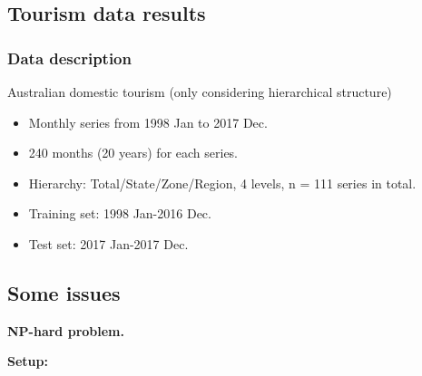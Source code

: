 \documentclass[
  letterpaper,
  DIV=11,
  numbers=noendperiod]{scrartcl}
\providecommand{\tightlist}{%
  \setlength{\itemsep}{0pt}\setlength{\parskip}{0pt}}\usepackage{longtable,booktabs,array}
\begin{document}
\hypertarget{tourism-data-results}{%
\subsection{Tourism data results}\label{tourism-data-results}}

\hypertarget{data-description}{%
\subsubsection{Data description}\label{data-description}}

Australian domestic tourism (only considering hierarchical structure)

\begin{itemize}
\tightlist
\item
  Monthly series from 1998 Jan to 2017 Dec.
\item
  240 months (20 years) for each series.
\item
  Hierarchy: Total/State/Zone/Region, 4 levels, n = 111 series in total.
\item
  Training set: 1998 Jan-2016 Dec.
\item
  Test set: 2017 Jan-2017 Dec.
\end{itemize}

\hypertarget{some-issues}{%
\subsection{Some issues}\label{some-issues}}

\textbf{NP-hard problem.}

\textbf{Setup:}
\end{document}
